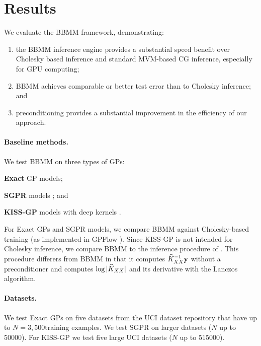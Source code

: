 \section{Results}
\label{sec:bbmm_results}

We evaluate the BBMM framework, demonstrating:
\begin{enumerate}
	\item the BBMM inference engine provides a substantial speed benefit over Cholesky based inference and standard MVM-based CG inference, especially for GPU computing;
	\item BBMM achieves comparable or better test error than to Cholesky inference; and
	\item preconditioning provides a substantial improvement in the efficiency of our approach.
\end{enumerate}

\paragraph{Baseline methods.}
We test BBMM on three types of GPs:
\begin{enumerate*}
  \item {\bf Exact} GP models;
  \item {\bf SGPR} models \cite{titsias2009variational}; and
  \item {\bf KISS-GP} models with deep kernels \cite{wilson2015kernel,wilson2016deep}.
\end{enumerate*}
For Exact GPs and SGPR models, we compare BBMM against Cholesky-based training (as implemented in GPFlow \cite{matthews2017gpflow}).
Since KISS-GP is not intended for Cholesky inference, we compare BBMM to the inference procedure of \citet{dong2017scalable}.
This procedure differers from BBMM in that it computes $\widehat{K}_{XX}^{-1} \mathbf{y}$ without a preconditioner and computes $\log \vert \widehat{K}_{XX} \vert$ and its derivative with the Lanczos algorithm.

\paragraph{Datasets.}
We test Exact GPs on five datasets from the UCI dataset repository \cite{asuncion2007uci} that have up to $N=3,\!500 $training examples.
We test SGPR on larger datasets ($N$ up to 50000).
For KISS-GP we test five large UCI datasets ($N$ up to 515000).

